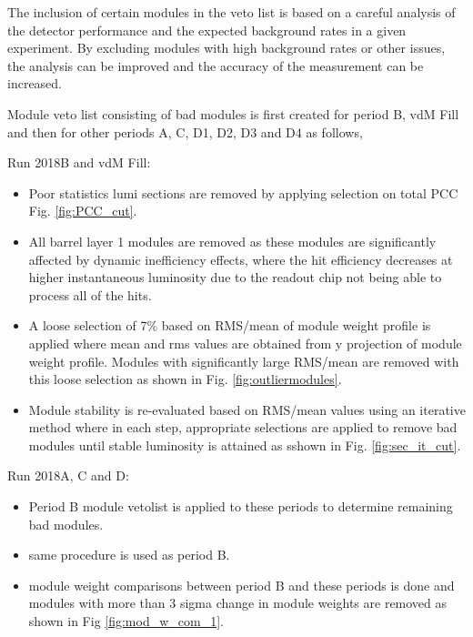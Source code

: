 The inclusion of certain modules in the veto list is based on a careful analysis of the detector performance and the expected background rates in a given experiment. By excluding modules with high background rates or other issues, the analysis can be improved and the accuracy of the measurement can be increased.


Module veto list consisting of bad modules is first created for period B, vdM Fill and then for other periods A, C, D1, D2, D3 and D4 as follows, 

Run 2018B and vdM Fill:
\begin{itemize}

\item Poor statistics lumi sections are removed by applying selection on total PCC Fig. \ref{fig:PCC_cut}. %

\item All barrel layer 1 modules are removed as these modules are significantly affected by dynamic inefficiency effects, where the hit efficiency decreases at higher instantaneous luminosity due to the readout chip not being able to process all of the hits.
  
\item A loose selection of 7\% based on RMS/mean of module weight profile is applied where mean and rms values are obtained from y projection of module weight profile. Modules with significantly large RMS/mean are removed with this loose selection as shown in Fig. \ref{fig:outliermodules}. 

\item Module stability is re-evaluated based on RMS/mean values using an iterative method where in each step, appropriate selections are applied to remove bad modules until stable luminosity is attained as sshown in Fig. \ref{fig:sec_it_cut}.                                                      
\end{itemize}

Run 2018A, C and D:                                                                      
\begin{itemize}  

\item Period B module vetolist is applied to these periods to determine remaining bad modules.

\item same procedure is used as period B. 

\item module weight comparisons between period B and these periods is done and modules with more than 3 sigma change in module weights are removed as shown in %
  Fig \ref{fig:mod_w_com_1}.                                                                              
\end{itemize}


